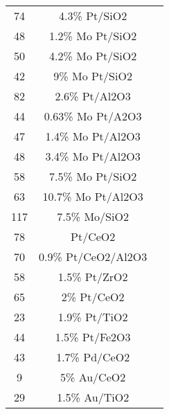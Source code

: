 \begin{center}
\begin{longtable}{ccc}
74                   & 4.3\% Pt/SiO2                           & \cite{Williams_2012}         \\
48                   & 1.2\% Mo Pt/SiO2                        & \cite{Williams_2012}         \\
50                   & 4.2\% Mo Pt/SiO2                        & \cite{Williams_2012}         \\
42                   & 9\% Mo Pt/SiO2                          & \cite{Williams_2012}         \\
82                   & 2.6\% Pt/Al2O3                          & \cite{Williams_2012}         \\
44                   & 0.63\% Mo Pt/A2O3                       & \cite{Williams_2012}         \\
47                   & 1.4\% Mo Pt/Al2O3                       & \cite{Williams_2012}         \\
48                   & 3.4\% Mo Pt/Al2O3                       & \cite{Williams_2012}         \\
58                   & 7.5\% Mo Pt/SiO2                        & \cite{Williams_2012}         \\
63                   & 10.7\% Mo Pt/Al2O3                      & \cite{Williams_2012}         \\
117                  & 7.5\% Mo/SiO2                           & \cite{Williams_2012}         \\
78                   & Pt/CeO2                                 & \cite{Williams_2012}         \\
70                   & 0.9\% Pt/CeO2/Al2O3                     & \cite{Thinon_2008}         \\
58                   & 1.5\% Pt/ZrO2                           & \cite{Thinon_2008}         \\
65                   & 2\% Pt/CeO2                             & \cite{Thinon_2008}         \\
23                   & 1.9\% Pt/TiO2                           & \cite{Thinon_2008}         \\
44                   & 1.5\% Pt/Fe2O3                          & \cite{Thinon_2008}         \\
43                   & 1.7\% Pd/CeO2                           & \cite{Thinon_2008}         \\
9                    & 5\% Au/CeO2                             & \cite{Thinon_2008}         \\
29                   & 1.5\% Au/TiO2                           & \cite{Thinon_2008}         \\

\end{longtable}
\end{center}
